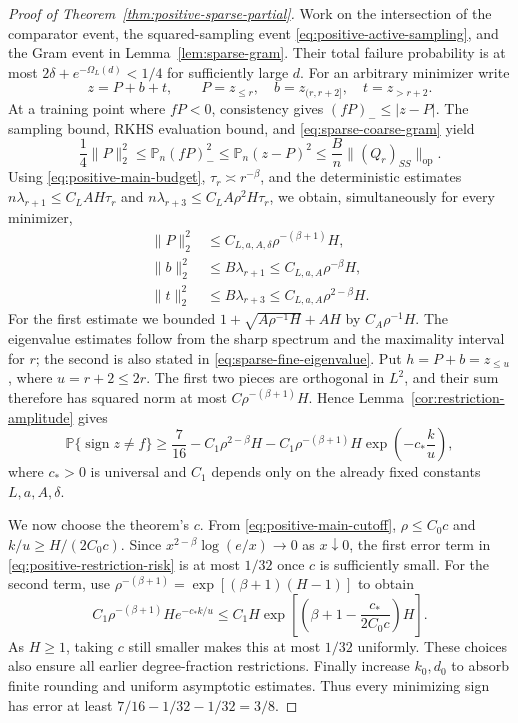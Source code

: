 \begin{proof}[Proof of Theorem~\ref{thm:positive-sparse-partial}]
Work on the intersection of the comparator event, the squared-sampling
event \eqref{eq:positive-active-sampling}, and the Gram event in
Lemma~\ref{lem:sparse-gram}. Their total failure probability is
at most $2\delta+e^{-\Omega_L(d)}<1/4$ for sufficiently large $d$.
For an arbitrary minimizer write
\[
 z=P+b+t,\qquad P=z_{\le r},\quad b=z_{(r,r+2]},\quad t=z_{>r+2}.
\]
At a training point where $fP<0$, consistency gives
$(fP)_-\le|z-P|$. The sampling bound, RKHS evaluation bound, and
\eqref{eq:sparse-coarse-gram} yield
\[
 \frac14\|P\|_2^2
 \le\mathbb P_n(fP)_-^2
 \le\mathbb P_n(z-P)^2
 \le\frac Bn\|(Q_r)_{SS}\|_{\mathrm{op}}.
\]
Using \eqref{eq:positive-main-budget}, $\tau_r\asymp r^{-\beta}$,
and the deterministic estimates
$n\lambda_{r+1}\le C_L A H\tau_r$ and
$n\lambda_{r+3}\le C_L A\rho^2H\tau_r$, we obtain, simultaneously
for every minimizer,
\begin{align}
 \|P\|_2^2&\le C_{L,a,A,\delta}\rho^{-(\beta+1)}H,
 \label{eq:positive-partial-head}\\
 \|b\|_2^2&\le B\lambda_{r+1}
             \le C_{L,a,A}\rho^{-\beta}H,
 \label{eq:positive-partial-band}\\
 \|t\|_2^2&\le B\lambda_{r+3}
             \le C_{L,a,A}\rho^{2-\beta}H.
 \label{eq:positive-partial-tail}
\end{align}
For the first estimate we bounded
$1+\sqrt{A\rho^{-1}H}+AH$ by $C_A\rho^{-1}H$.
The eigenvalue estimates follow from the sharp spectrum and the
maximality interval for $r$; the second is also stated in
\eqref{eq:sparse-fine-eigenvalue}.
Put $h=P+b=z_{\le u}$, where $u=r+2\le2r$.
The first two pieces are orthogonal in $L^2$, and their sum therefore
has squared norm at most $C\rho^{-(\beta+1)}H$. Hence
Lemma~\ref{cor:restriction-amplitude} gives
\begin{equation}
 \mathbb P\{\operatorname{sign}z\ne f\}
 \ge\frac7{16}
       -C_1\rho^{2-\beta}H
       -C_1\rho^{-(\beta+1)}H\exp\!\left(-c_*\frac{k}{u}\right),
 \label{eq:positive-restriction-risk}
\end{equation}
where $c_*>0$ is universal and $C_1$ depends only on the already fixed
constants $L,a,A,\delta$.

We now choose the theorem's $c$. From
\eqref{eq:positive-main-cutoff}, $\rho\le C_0c$ and
$k/u\ge H/(2C_0c)$.
Since $x^{2-\beta}\log(e/x)\to0$ as $x\downarrow0$, the first error
term in \eqref{eq:positive-restriction-risk} is at most $1/32$ once
$c$ is sufficiently small. For the second term, use
$\rho^{-(\beta+1)}=\exp[(\beta+1)(H-1)]$ to obtain
\[
 C_1\rho^{-(\beta+1)}H e^{-c_*k/u}
 \le C_1 H\exp\!\left[
       \left(\beta+1-\frac{c_*}{2C_0c}\right)H\right].
\]
As $H\ge1$, taking $c$ still smaller makes this at most $1/32$
uniformly. These choices also ensure all earlier degree-fraction
restrictions. Finally increase $k_0,d_0$ to absorb finite rounding and
uniform asymptotic estimates. Thus every minimizing sign has error at
least $7/16-1/32-1/32=3/8$.


\end{proof}

